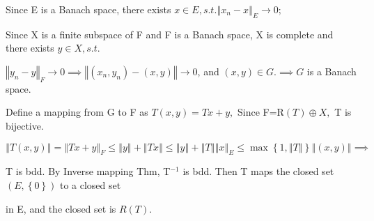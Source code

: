\documentclass{article}
\begin{document}
Since E is a Banach space, there exists $x\in E,s.t.\left\Vert
x_{n}-x\right\Vert _{E}\rightarrow 0;$

Since X is a finite subspace of F and F is a Banach space, X is complete and
there exists $y\in X,s.t.$

$\left\Vert y_{n}-y\right\Vert _{F}\rightarrow 0\implies \left\Vert \left(
x_{n},y_{n}\right) -\left( x,y\right) \right\Vert \rightarrow 0$, and $%
\left( x,y\right) \in G.\implies G$ is a Banach space.

Define a mapping from G to F as $T\left( x,y\right) =Tx+y,$ Since F=R$\left(
T\right) \oplus X,$ T is bijective.

$\left\Vert T\left( x,y\right) \right\Vert =\left\Vert Tx+y\right\Vert
_{F}\leq \left\Vert y\right\Vert +\left\Vert Tx\right\Vert \leq \left\Vert
y\right\Vert +\left\Vert T\right\Vert \left\Vert x\right\Vert _{E}\leq \max
\left\{ 1,\left\Vert T\right\Vert \right\} \left\Vert \left( x,y\right)
\right\Vert \implies $

T is bdd. By Inverse mapping Thm, T$^{-1}$ is bdd. Then T maps the closed
set $\left( E,\left\{ 0\right\} \right) $ to a closed set

in E, and the closed set is $R\left( T\right) .$
\end{document}

